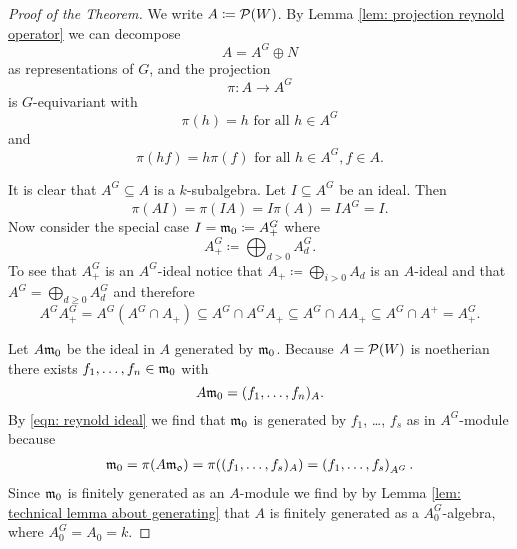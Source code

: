 \begin{proof}[Proof of the Theorem]
  We write $A \coloneqq \mathcal{P}(W)$. By Lemma \ref{lem: projection reynold operator} we can decompose
  \[
      A
    = A^G \oplus N
  \]
  as representations of $G$, and the projection
  \[
            \pi
    \colon  A
    \to     A^G
  \]
  is $G$-equivariant with
  \[
     \pi(h)
    = h
    \text{ for all }
    h \in A^G
  \]
  and
  \[
      \pi(hf)
    = h\pi(f)
    \text{ for all }
    h \in A^G,
    f \in A.
  \]
  
  It is clear that $A^G \subseteq A$ is a $k$-subalgebra.
  Let $I \subseteq A^G$ be an ideal. Then
  \begin{equation}\label{eqn: reynold ideal}
      \pi(A I)
    = \pi(I A)
    = I \pi(A)
    = I A^G
    = I.
  \end{equation}
  Now consider the special case $I = \mathfrak{m}_0 \coloneqq A^G_+$ where
  \[
              A^G_+
    \coloneqq \bigoplus_{d > 0} A^G_d.
  \]
  To see that $A^G_+$ is an $A^G$-ideal notice that $A_+ \coloneqq \bigoplus_{i > 0} A_d$ is an $A$-ideal and that $A^G = \bigoplus_{d \geq 0} A^G_d$ and therefore
  \[
              A^G A^G_+
    =         A^G \left( A^G \cap A_+ \right)
    \subseteq A^G \cap A^G A_+
    \subseteq A^G \cap A A_+
    \subseteq A^G \cap A^+
    =         A^G_+.
  \]
  
  Let $A \mathfrak{m}_0$ be the ideal in $A$ generated by $\mathfrak{m}_0$.
  Because $A = \mathcal{P}(W)$ is noetherian there exists $f_1, \dotsc, f_n \in \mathfrak{m}_0$ with
  \[
      A \mathfrak{m}_0
    = (f_1, \dotsc, f_n)_A.
  \]
  By \eqref{eqn: reynold ideal} we find that $\mathfrak{m}_0$ is generated by $f_1$, \dots, $f_s$ as in $A^G$-module because
  \begin{align*}
      \mathfrak{m}_0
    = \pi(A \mathfrak{m_0})
    = \pi( (f_1, \dotsc, f_s)_A )
    = \left( f_1, \dotsc, f_s \right)_{A^G}.
  \end{align*}
  Since $\mathfrak{m}_0$ is finitely generated as an $A$-module we find by by Lemma \ref{lem: technical lemma about generating} that $A$ is finitely generated as a $A_0^G$-algebra, where $A_0^G = A_0 = k$.
\end{proof}




